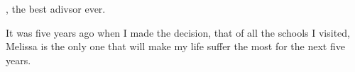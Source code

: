 
, the best adivsor ever.

It was five years ago when I made the decision, that of all the schools I visited, Melissa is the only one that will make my life suffer the most for the next five years.
